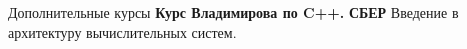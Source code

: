\begin{rubric}{Дополнительные курсы}
\entry*[3 -- 4 семестр]%
	\textbf{Курс Владимирова по C++.}
%
\entry*[4 семестр]%
	\textbf{СБЕР} Введение в архитектуру вычислительных систем.
% 
\end{rubric}